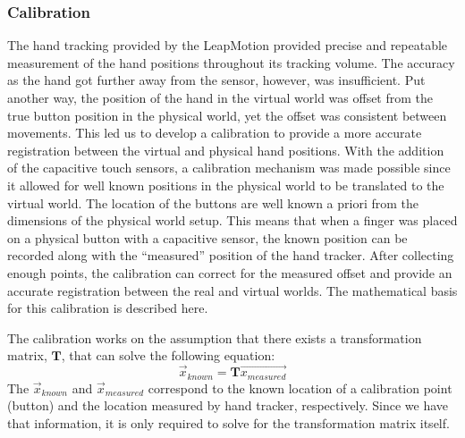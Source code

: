 \subsubsection{Calibration}

The hand tracking provided by the LeapMotion provided precise and repeatable measurement of the hand positions throughout its tracking volume.
The accuracy as the hand got further away from the sensor, however, was insufficient.
Put another way, the position of the hand in the virtual world was offset from the true button position in the physical world, yet the offset was consistent between movements.
This led us to develop a calibration to provide a more accurate registration between the virtual and physical hand positions.
With the addition of the capacitive touch sensors, a calibration mechanism was made possible since it allowed for well known positions in the physical world to be translated to the virtual world.
The location of the buttons are well known a priori from the dimensions of the physical world setup.
This means that when a finger was placed on a physical button with a capacitive sensor, the known position can be recorded along with the ``measured'' position of the hand tracker.
After collecting enough points, the calibration can correct for the measured offset and provide an accurate registration between the real and virtual worlds.
The mathematical basis for this calibration is described here.

The calibration works on the assumption that there exists a transformation matrix, $\mathbf{T}$, that can solve the following equation:
\begin{equation}
    \vec{x}_{known} = \mathbf{T}\vec{x_{measured}}
    \label{eq:proto_Tvec}
\end{equation}
The $\vec{x}_{known}$ and $\vec{x}_{measured}$ correspond to the known location of a calibration point (button) and the location measured by hand tracker, respectively.
Since we have that information, it is only required to solve for the transformation matrix itself.

